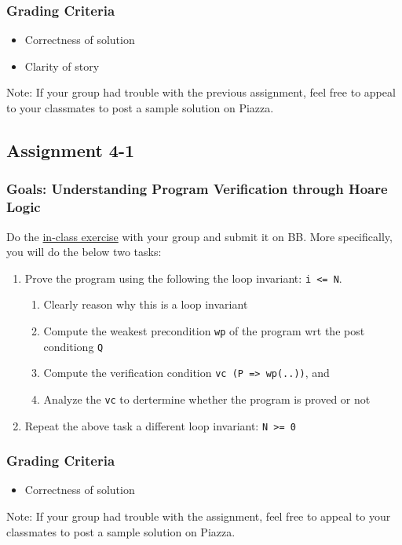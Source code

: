 \documentclass[11pt]{article}
\begin{document}
\subsubsection{Grading Criteria}
\label{sec:orgac5d303}

\begin{itemize}
\item Correctness of solution
\item Clarity of story
\end{itemize}
Note: If your group had trouble with the previous assignment, feel free to appeal to your classmates to post a sample solution on Piazza.

\subsection{Assignment 4-1}
\label{sec:org645b614}
\subsubsection{Goals: Understanding Program Verification through Hoare Logic}
\label{sec:orga133e2b}

Do the \hyperref[sec:org6f6e901]{in-class exercise} with your group and submit it on BB. More specifically, you will do the below two tasks:
\begin{enumerate}
\item Prove the program using the following the loop invariant:  \texttt{i <= N}.
\begin{enumerate}
\item Clearly reason why this is a loop invariant
\item Compute the weakest precondition \texttt{wp} of the program wrt the post conditiong \texttt{Q}
\item Compute the verification condition \texttt{vc (P => wp(..))}, and
\item Analyze the \texttt{vc} to dertermine whether the program is proved or not
\end{enumerate}
\item Repeat the above task a different loop invariant:  \texttt{N >= 0}
\end{enumerate}

\subsubsection{Grading Criteria}
\label{sec:org7010b3c}

\begin{itemize}
\item Correctness of solution
\end{itemize}
Note: If your group had trouble with the assignment, feel free to appeal to your classmates to post a sample solution on Piazza.
\end{document}
